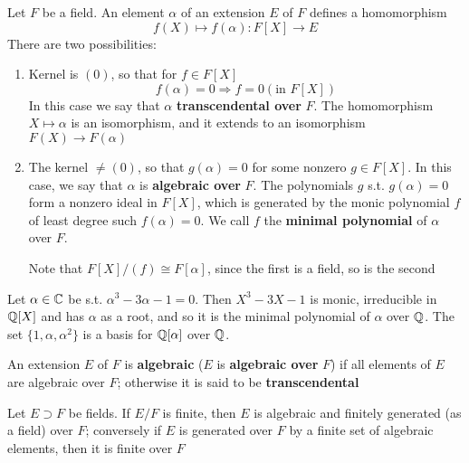 \documentclass[11pt]{article}
\begin{document}
Let \(F\) be a field. An element \(\alpha\) of an extension \(E\) of \(F\) defines a homomorphism
\begin{equation*}
f(X)\mapsto f(\alpha):F[X]\to E
\end{equation*}
There are two possibilities:
\begin{enumerate}
\item Kernel is \((0)\), so that for \(f\in F[X]\)
\begin{equation*}
f(\alpha)=0\Rightarrow f=0 (\text{in }F[X])
\end{equation*}
In this case we say that \(\alpha\) \textbf{transcendental over} \(F\). The homomorphism \(X\mapsto\alpha\) is an
isomorphism, and it extends to an isomorphism \(F(X)\to F(\alpha)\)
\item The kernel \(\neq(0)\), so that \(g(\alpha)=0\) for some nonzero \(g\in F[X]\). In this case, we say
that \(\alpha\) is \textbf{algebraic over} \(F\).  The polynomials \(g\) s.t. \(g(\alpha)=0\) form a nonzero ideal
in \(F[X]\), which is generated by the monic polynomial \(f\) of least degree
such \(f(\alpha)=0\). We call \(f\) the \textbf{minimal polynomial} of \(\alpha\) over \(F\).

Note that \(F[X]/(f)\cong F[\alpha]\), since the first is a field, so is the second
\end{enumerate}


\begin{examplle}[]
Let \(\alpha\in\mathbb{C}\) be s.t. \(\alpha^3-3\alpha-1=0\). Then \(X^3-3X-1\) is monic, irreducible in \(\mathbb{Q}[X]\) and  has
\(\alpha\) as a root, and so it is the minimal polynomial of \(\alpha\) over \(\mathbb{Q}\). The set \(\{1,\alpha,\alpha^2\}\) is a
basis for \(\mathbb{Q}[\alpha]\) over \(\mathbb{Q}\).
\end{examplle}

An extension \(E\) of \(F\) is \textbf{algebraic} (\(E\) is \textbf{algebraic over} \(F\)) if all elements
of \(E\) are algebraic over \(F\); otherwise it is said to be \textbf{transcendental}

\begin{proposition}[]
Let \(E\supset F\) be fields. If \(E/F\) is finite, then \(E\) is algebraic and finitely generated (as
a field) over \(F\); conversely if \(E\) is generated over \(F\) by a finite set of algebraic
elements, then it is finite over \(F\)
\end{proposition}
\end{document}
